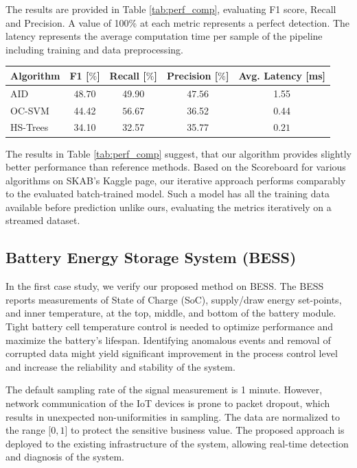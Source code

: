 The results are provided in Table \ref{tab:perf_comp}, evaluating F1 score, Recall and Precision. A value of 100\% at each metric represents a perfect detection. The latency represents the average computation time per sample of the pipeline including training and data preprocessing.

\begin{table}[htbp]
\begin{center}
\begin{tabular}{|l|c|c|c|c|}
    \hline
    \textbf{Algorithm} & F1 [$\%$] & Recall [$\%$] & Precision [$\%$] & Avg. Latency [ms] \\
    \hline
    AID & $\boldsymbol{48.70}$ & 49.90 & $\boldsymbol{47.56}$ & 1.55 \\
    \hline
    OC-SVM & 44.42 & $\boldsymbol{56.67}$ & 36.52 & 0.44 \\
    \hline
    HS-Trees & 34.10 & 32.57 & 35.77 & $\boldsymbol{0.21}$ \\
    \hline
\end{tabular}
\end{center}
\end{table}

The results in Table \ref{tab:perf_comp} suggest, that our algorithm provides slightly better performance than reference methods. Based on the Scoreboard for various algorithms on SKAB's Kaggle page, our iterative approach performs comparably to the evaluated batch-trained model. Such a model has all the training data available before prediction unlike ours, evaluating the metrics iteratively on a streamed dataset.

\subsection{Battery Energy Storage System (BESS)}\label{AA:BESS}
In the first case study, we verify our proposed method on BESS. The BESS reports measurements of State of Charge (SoC), supply/draw energy set-points, and inner temperature, at the top, middle, and bottom of the battery module. Tight battery cell temperature control is needed to optimize performance and maximize the battery's lifespan. Identifying anomalous events and removal of corrupted data might yield significant improvement in the process control level and increase the reliability and stability of the system.

The default sampling rate of the signal measurement is 1 minute. However, network communication of the IoT devices is prone to packet dropout, which results in unexpected non-uniformities in sampling. The data are normalized to the range $[0, 1$] to protect the sensitive business value. The proposed approach is deployed to the existing infrastructure of the system, allowing real-time detection and diagnosis of the system.

